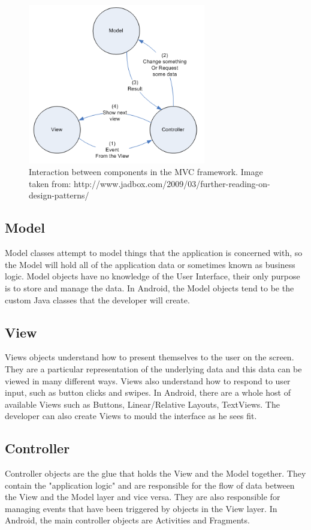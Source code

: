 \documentclass{l4proj}
\begin{document}
\begin{figure}
\centering
\includegraphics[height=7cm]{mvc.png}
\caption{Interaction between components in the MVC framework. Image taken from: http://www.jadbox.com/2009/03/further-reading-on-design-patterns/}
\label{mvc}
\end{figure}

\subsection{Model}
Model classes attempt to model things that the application is concerned with, so the Model will hold all of the application data or sometimes known as business logic.  Model objects have no knowledge of the User Interface, their only purpose is to store and manage the data. In Android, the Model objects tend to be the custom Java classes that the developer will create.

\subsection{View}
Views objects understand how to present themselves to the user on the screen.  They are a particular representation of the underlying data and this data can be viewed in many different ways. Views also understand how to respond to user input, such as button clicks and swipes.  In Android, there are a whole host of available Views such as Buttons, Linear/Relative Layouts, TextViews. The developer can also create Views to mould the interface as he sees fit.

\subsection{Controller}
Controller objects are the glue that holds the View and the Model together.  They contain the "application logic" and are responsible for the flow of data between the View and the Model layer and vice versa. They are also responsible for managing events that have been triggered by objects in the View layer. In Android, the main controller objects are Activities and Fragments.
\end{document}

